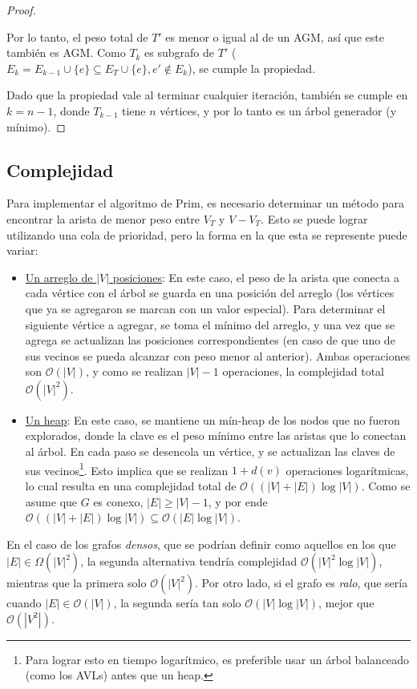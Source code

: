 \documentclass[a4paper]{report}
\newcommand{\BigO}[1]{\ensuremath{\mathcal{O}(#1)}}
\newcommand{\BigOmega}[1]{\ensuremath{\Omega(#1)}}
\begin{document}
\begin{proof}
\begin{itemize}
              Por lo tanto, el peso total de $T'$ es menor o igual al de un AGM, así que este también es AGM. Como $T_k$ es subgrafo de $T'$ ($E_k = E_{k - 1} \cup \{e\} \subseteq E_T \cup \{e\}, e' \notin E_k$), se cumple la propiedad.
    \end{itemize}

    Dado que la propiedad vale al terminar cualquier iteración, también se cumple en $k = n - 1$, donde $T_{k - 1}$ tiene $n$ vértices, y por lo tanto es un árbol generador (y mínimo).

\end{proof}

\subsection{Complejidad}

Para implementar el algoritmo de Prim, es necesario determinar un método para encontrar la arista de menor peso entre $V_T$ y $V - V_T$. Esto se puede lograr utilizando una cola de prioridad, pero la forma en la que esta se represente puede variar:
\begin{itemize}
    \item \underline{Un arreglo de $|V|$ posiciones}: En este caso, el peso de la arista que conecta a cada vértice con el árbol se guarda en una posición del arreglo (los vértices que ya se agregaron se marcan con un valor especial). Para determinar el siguiente vértice a agregar, se toma el mínimo del arreglo, y una vez que se agrega se actualizan las posiciones correspondientes (en caso de que uno de sus vecinos se pueda alcanzar con peso menor al anterior). Ambas operaciones son \BigO{|V|}, y como se realizan $|V| - 1$ operaciones, la complejidad total \BigO{|V|^2}.
    \item \underline{Un heap}: En este caso, se mantiene un mín-heap de los nodos que no fueron explorados, donde la clave es el peso mínimo entre las aristas que lo conectan al árbol. En cada paso se desencola un vértice, y se actualizan las claves de sus vecinos\footnote{Para lograr esto en tiempo logarítmico, es preferible usar un árbol balanceado (como los AVLs) antes que un heap.}. Esto implica que se realizan $1 + d(v)$ operaciones logarítmicas, lo cual resulta en una complejidad total de \BigO{(|V| + |E|)\log{|V|}}. Como se asume que $G$ es conexo, $|E| \geq |V| - 1$, y por ende $\BigO{(|V| + |E|)\log{|V|}} \subseteq \BigO{|E|\log{|V|}}$.
\end{itemize}

En el caso de los grafos \textit{densos}, que se podrían definir como aquellos en los que $|E| \in \BigOmega{|V|^2}$, la segunda alternativa tendría complejidad \BigO{|V|^2\log{|V|}}, mientras que la primera solo \BigO{|V|^2}. Por otro lado, si el grafo es \textit{ralo}, que sería cuando $|E| \in \BigO{|V|}$, la segunda sería tan solo \BigO{|V|\log{|V|}}, mejor que \BigO{|V^2|}.
\end{document}
